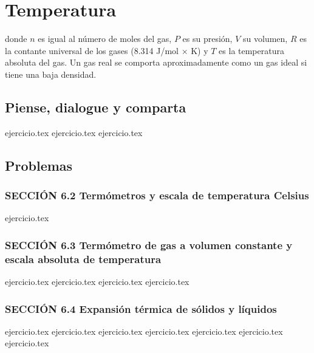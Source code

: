 \chapter{Temperatura}
\label{cap:temperatura}

donde $n$ es igual al número de moles del gas, $P$ es su presión, $V$ su volumen, $R$ es la contante universal de los gases (8.314 J/mol $\times$ K) y $T$ es la temperatura absoluta del gas. Un gas real se comporta aproximadamente como un gas ideal si tiene una baja densidad.

\section*{Piense, dialogue y comparta}
\begin{enumerate}
    {ejercicio.tex}
    {ejercicio.tex}
    {ejercicio.tex}
\end{enumerate}

\section*{Problemas}

\subsection*{SECCIÓN 6.2 Termómetros y escala de temperatura Celsius}
\begin{enumerate}
    {ejercicio.tex}
\end{enumerate}

\subsection*{SECCIÓN 6.3 Termómetro de gas a volumen constante y escala absoluta de temperatura}
\begin{enumerate}
    \setcounter{enumi}{1}
    {ejercicio.tex}
    {ejercicio.tex}
    {ejercicio.tex}
    {ejercicio.tex}
\end{enumerate}

\subsection*{SECCIÓN 6.4 Expansión térmica de sólidos y líquidos}
\begin{enumerate}
    \setcounter{enumi}{5}
    {ejercicio.tex}
    {ejercicio.tex}
    {ejercicio.tex}
    {ejercicio.tex}
    {ejercicio.tex}
    {ejercicio.tex}
    {ejercicio.tex}
\end{enumerate}

